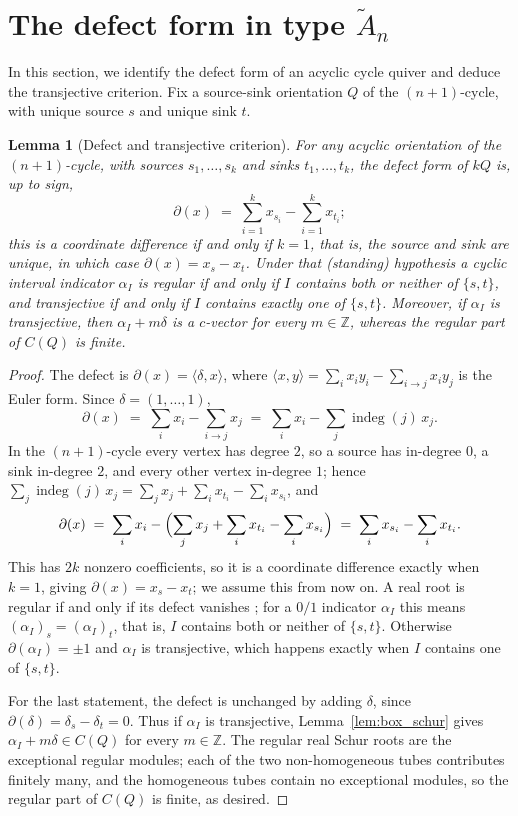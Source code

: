 \documentclass[11pt, a4paper]{amsart}
\newtheorem{lemma}[theorem]{Lemma}
\theoremstyle{definition}
\newcommand{\ZZ}{\mathbb{Z}}
\DeclareMathOperator{\indeg}{indeg}
\begin{document}
\section{The defect form in type \texorpdfstring{$\widetilde{A}_n$}{An}}
\label{sec:defect}

In this section, we identify the defect form of an acyclic cycle quiver
and deduce the transjective criterion. Fix a source-sink orientation $Q$ of
the $(n+1)$-cycle, with unique source $s$ and unique sink $t$.

\begin{lemma}[Defect and transjective criterion]
\label{lem:defect}
For any acyclic orientation of the $(n+1)$-cycle, with sources $s_1, \dots,
s_k$ and sinks $t_1, \dots, t_k$, the defect form of $kQ$ is, up to sign,
\[
  \partial(x) \;=\; \sum_{i=1}^{k} x_{s_i} - \sum_{i=1}^{k} x_{t_i};
\]
this is a coordinate difference if and only if $k = 1$, that is, the source
and sink are unique, in which case $\partial(x) = x_s - x_t$. Under that
\textup{(}standing\textup{)} hypothesis a cyclic interval indicator
$\alpha_I$ is regular if and only
if $I$ contains both or neither of $\{s, t\}$, and transjective if and
only if $I$ contains exactly one of $\{s, t\}$. Moreover, if $\alpha_I$ is
transjective, then $\alpha_I + m\delta$ is a $c$-vector for every
$m \in \ZZ$, whereas the regular part of $C(Q)$ is finite.
\end{lemma}

\begin{proof}
The defect is $\partial(x) = \langle \delta, x \rangle$, where
$\langle x, y \rangle = \sum_{i} x_i y_i - \sum_{i \to j} x_i y_j$ is the
Euler form. Since $\delta = (1, \dots, 1)$,
\[
  \partial(x)
  \;=\; \sum_i x_i - \sum_{i \to j} x_j
  \;=\; \sum_i x_i - \sum_{j} \indeg(j)\, x_j.
\]
In the $(n+1)$-cycle every vertex has degree $2$, so a source has in-degree
$0$, a sink in-degree $2$, and every other vertex in-degree $1$; hence
$\sum_j \indeg(j)\, x_j = \sum_j x_j + \sum_i x_{t_i} - \sum_i x_{s_i}$, and
\[
  \partial(x) \;=\; \sum_i x_i - \Bigl(\sum_j x_j + \sum_i x_{t_i}
  - \sum_i x_{s_i}\Bigr) \;=\; \sum_i x_{s_i} - \sum_i x_{t_i}.
\]
This has $2k$ nonzero coefficients, so it is a coordinate difference exactly
when $k = 1$, giving $\partial(x) = x_s - x_t$; we assume this from now on.
A real root is regular if and only if its defect vanishes
\cite{Ringel1984}; for a $0/1$ indicator $\alpha_I$ this means
$(\alpha_I)_s = (\alpha_I)_t$, that is, $I$ contains both or neither of
$\{s, t\}$. Otherwise $\partial(\alpha_I) = \pm 1$ and $\alpha_I$ is
transjective, which happens exactly when $I$ contains one of $\{s, t\}$.

For the last statement, the defect is unchanged by adding $\delta$, since
$\partial(\delta) = \delta_s - \delta_t = 0$. Thus if $\alpha_I$ is
transjective, Lemma~\ref{lem:box_schur} gives
$\alpha_I + m\delta \in C(Q)$ for every $m \in \ZZ$. The regular real Schur
roots are the exceptional regular modules; each of the two
non-homogeneous tubes contributes finitely many, and the homogeneous
tubes contain no exceptional modules, so the regular part of $C(Q)$ is
finite, as desired.
\end{proof}
\end{document}
